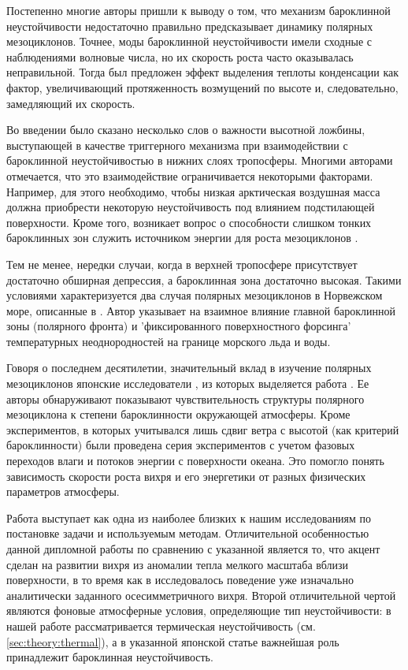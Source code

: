 Постепенно многие авторы пришли к выводу о том, что механизм бароклинной неустойчивости недостаточно правильно предсказывает динамику полярных мезоциклонов. Точнее, моды бароклинной неустойчивости имели сходные с наблюдениями волновые числа, но их скорость роста часто оказывалась неправильной. Тогда был предложен эффект выделения теплоты конденсации как фактор, увеличивающий протяженность возмущений по высоте и, следовательно, замедляющий их скорость.

Во введении было сказано несколько слов о важности высотной ложбины, выступающей в качестве триггерного механизма при взаимодействии с бароклинной неустойчивостью в нижних слоях тропосферы. Многими авторами отмечается, что это взаимодействие ограничивается некоторыми факторами. Например, для этого необходимо, чтобы низкая арктическая воздушная масса должна приобрести некоторую неустойчивость под влиянием подстилающей поверхности. Кроме того, возникает вопрос о способности слишком тонких бароклинных зон служить источником энергии для роста мезоциклонов \citep{AlbrightEtAl1995}.

Тем не менее, нередки случаи, когда в верхней тропосфере присутствует достаточно обширная депрессия, а бароклинная зона достаточно высокая. Такими условиями характеризуется два случая полярных мезоциклонов в Норвежском море, описанные в \citep{Nordeng1990}. Автор указывает на взаимное влияние главной бароклинной зоны (полярного фронта) и 'фиксированного поверхностного форсинга' температурных неоднородностей на границе морского льда и воды.

Говоря о последнем десятилетии, значительный вклад в изучение полярных мезоциклонов японские исследователи \citep{YanaseEtAl2004,YanaseNiino2004,Nagata1993}, из которых выделяется работа \citep{YanaseNiino2007}. Ее авторы обнаруживают показывают чувствительность структуры полярного мезоциклона к степени бароклинности окружающей атмосферы. Кроме экспериментов, в которых учитывался лишь сдвиг ветра с высотой (как критерий бароклинности) были проведена серия экспериментов с учетом фазовых переходов влаги и потоков энергии с поверхности океана. Это помогло понять зависимость скорости роста вихря и его энергетики от разных физических параметров атмосферы. 

Работа \citep{YanaseNiino2007} выступает как одна из наиболее близких к нашим исследованиям по постановке задачи и используемым методам. Отличительной особенностью данной дипломной работы по сравнению с указанной является то, что акцент сделан на развитии вихря из аномалии тепла мелкого масштаба вблизи поверхности, в то время как в \citep{YanaseNiino2007} исследовалось поведение уже изначально аналитически заданного осесимметричного вихря. Второй отличительной чертой являются фоновые атмосферные условия, определяющие тип неустойчивости: в нашей работе рассматривается термическая неустойчивость (см. \ref{sec:theory:thermal}), а в указанной японской статье важнейшая роль принадлежит бароклинная неустойчивость.

